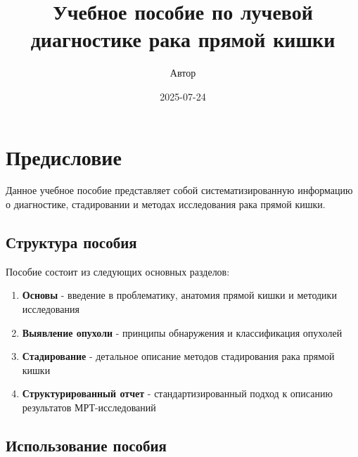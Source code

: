 \documentclass[
  russian,
  12pt,
  a4paper,
]{report}
\title{Учебное пособие по лучевой диагностике рака прямой кишки}
\author{Автор}
\date{2025-07-24}
\providecommand{\tightlist}{%
  \setlength{\itemsep}{0pt}\setlength{\parskip}{0pt}}
\renewcommand*\contentsname{Содержание}
\newcommand\contentsname{Содержание}
\begin{document}
\maketitle

\renewcommand*\contentsname{Содержание}
{
\hypersetup{linkcolor=}
\setcounter{tocdepth}{2}
\tableofcontents
}


\chapter*{Предисловие}\label{ux43fux440ux435ux434ux438ux441ux43bux43eux432ux438ux435}


Данное учебное пособие представляет собой систематизированную информацию
о диагностике, стадировании и методах исследования рака прямой кишки.

\section*{Структура
пособия}\label{ux441ux442ux440ux443ux43aux442ux443ux440ux430-ux43fux43eux441ux43eux431ux438ux44f}


Пособие состоит из следующих основных разделов:

\begin{enumerate}
\def\labelenumi{\arabic{enumi}.}
\tightlist
\item
  \textbf{Основы} - введение в проблематику, анатомия прямой кишки и
  методики исследования
\item
  \textbf{Выявление опухоли} - принципы обнаружения и классификация
  опухолей
\item
  \textbf{Стадирование} - детальное описание методов стадирования рака
  прямой кишки
\item
  \textbf{Структурированный отчет} - стандартизированный подход к
  описанию результатов МРТ-исследований
\end{enumerate}

\section*{Использование
пособия}\label{ux438ux441ux43fux43eux43bux44cux437ux43eux432ux430ux43dux438ux435-ux43fux43eux441ux43eux431ux438ux44f}
\end{document}
